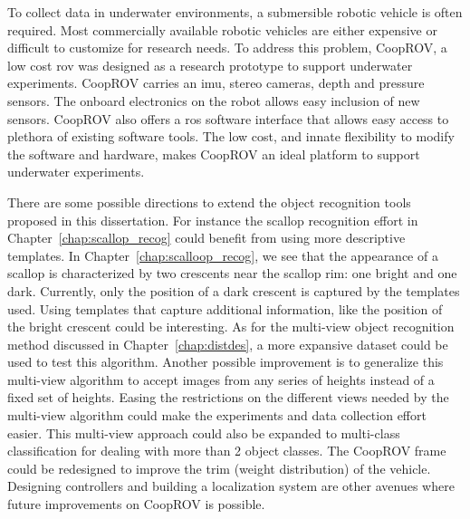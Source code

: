\documentclass {udthesis}
\begin{document}
To collect data in underwater environments, a submersible robotic vehicle is often required.
Most commercially available robotic vehicles are either expensive or difficult to customize for research needs. To address this problem, CoopROV, a low cost \gls{rov} was designed as a research prototype to support underwater experiments. CoopROV carries an \gls{imu}, stereo cameras, depth and pressure sensors. The onboard electronics on the robot allows easy inclusion of new sensors. CoopROV also offers a \gls{ros} software interface that allows easy access to plethora of existing software tools. The low cost, and innate flexibility to modify the software and hardware, makes CoopROV an ideal platform to support underwater experiments.

There are some possible directions to extend the object recognition tools proposed in this dissertation. For instance the scallop recognition effort in Chapter~\ref{chap:scallop_recog} could benefit from using more descriptive 
templates. In Chapter~\ref{chap:scalloop_recog}, we see that the appearance of a scallop is characterized by two crescents near the scallop rim: one bright and one dark. Currently, only the position of a dark crescent is captured by the templates used. Using templates that capture additional information, like the position of the bright crescent could be interesting. As for the multi-view object recognition method discussed in Chapter~\ref{chap:distdes}, a more expansive dataset could be used to test this algorithm. Another possible improvement is to generalize this multi-view algorithm to accept images from any series of heights instead of a fixed set of heights. Easing the restrictions on the different views needed by the multi-view algorithm could make the experiments and data collection effort easier. This multi-view approach could also be expanded to multi-class classification for dealing with more than 2 object classes. The CoopROV frame could be redesigned to improve the trim (weight distribution) of the vehicle. Designing controllers and building a localization system are other avenues where future improvements on CoopROV is possible.
\end{document}
